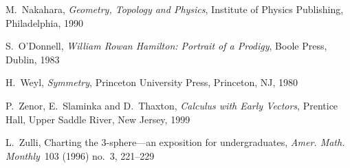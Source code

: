 \documentclass[11pt]{article}
\begin{document}
\begin{thebibliography}{99}
M.~Nakahara, {\it Geometry, Topology and Physics}, Institute of Physics
Publishing, Philadelphia, 1990

S.~O'Donnell, {\it William Rowan Hamilton: Portrait of a Prodigy}, Boole
Press, Dublin, 1983

H.~Weyl, {\it Symmetry}, Princeton University Press, Princeton, NJ, 1980

P.~Zenor, E.~Slaminka and D.~Thaxton, {\it Calculus with Early Vectors},
Prentice Hall, Upper Saddle River, New Jersey, 1999

L.~Zulli, Charting the 3-sphere---an exposition for undergraduates, {\it
Amer. Math. Monthly}~103 (1996) no.~3, 221--229

\end{thebibliography}

% 
\end{document}
